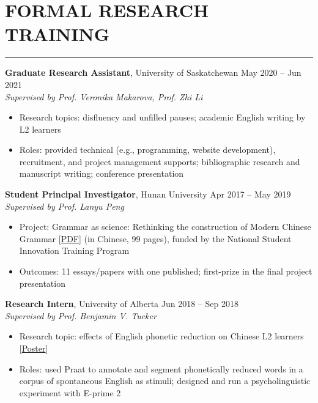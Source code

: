 \documentclass[a4paper, 11pt]{article}  %
\begin{document}
\section*{FORMAL RESEARCH TRAINING}
\hrule 
\vspace{11pt}

\textbf{Graduate Research Assistant}, University of Saskatchewan \hfill May 2020 – Jun 2021 \vspace{3pt} \\ 
\emph{Supervised by Prof. Veronika Makarova, Prof. Zhi Li}

\begin{itemize}
	\itemsep0em 
	
	\item{Research topics: disfluency and unfilled pauses; academic English writing by L2 learners}
	\item{Roles: provided technical (e.g., programming, website development), recruitment, and project management supports; bibliographic research and manuscript writing; conference presentation}
	
\end{itemize}

\vspace{11pt}

\noindent
\textbf{Student Principal Investigator}, Hunan University \hfill Apr 2017 – May 2019 \vspace{3pt} \\ 
\emph{Supervised by Prof. Lanyu Peng}
\begin{itemize}
	\itemsep0em 
	
	\item{Project: Grammar as science: Rethinking the construction of Modern Chinese Grammar [\href{https://drive.google.com/file/d/1h_u2THzdFSRTRMPgM2UDXj7O_dGkJAN3/view}{PDF}] (in Chinese, 99 pages), funded by the National Student Innovation Training Program}
	\item{Outcomes: 11 essays/papers with one published; first-prize in the final project presentation}
	
\end{itemize}

\vspace{11pt}

\noindent
\textbf{Research Intern}, University of Alberta \hfill Jun 2018 – Sep 2018 \vspace{3pt} \\ 
\emph{Supervised by Prof. Benjamin V. Tucker}
\begin{itemize}
	\itemsep0em 
	
	\item{Research topic: effects of English phonetic reduction on Chinese L2 learners [\href{https://drive.google.com/file/d/1Pq59XVx5zYgCazE93btu9G8RI6Mk_tVC/view}{Poster}]}
	\item{Roles: used Praat to annotate and segment phonetically reduced words in a corpus of spontaneous English as stimuli; designed and run a psycholinguistic experiment with E-prime 2}
	
\end{itemize}
\end{document}
